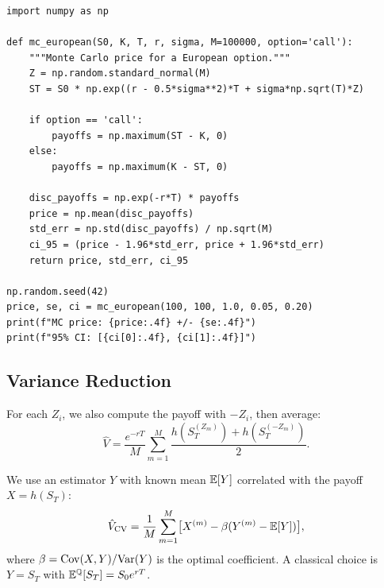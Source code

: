 \begin{codeblock}[title=\textbf{Monte Carlo for a European Call}]
\begin{verbatim}
import numpy as np

def mc_european(S0, K, T, r, sigma, M=100000, option='call'):
    """Monte Carlo price for a European option."""
    Z = np.random.standard_normal(M)
    ST = S0 * np.exp((r - 0.5*sigma**2)*T + sigma*np.sqrt(T)*Z)

    if option == 'call':
        payoffs = np.maximum(ST - K, 0)
    else:
        payoffs = np.maximum(K - ST, 0)

    disc_payoffs = np.exp(-r*T) * payoffs
    price = np.mean(disc_payoffs)
    std_err = np.std(disc_payoffs) / np.sqrt(M)
    ci_95 = (price - 1.96*std_err, price + 1.96*std_err)
    return price, std_err, ci_95

np.random.seed(42)
price, se, ci = mc_european(100, 100, 1.0, 0.05, 0.20)
print(f"MC price: {price:.4f} +/- {se:.4f}")
print(f"95% CI: [{ci[0]:.4f}, {ci[1]:.4f}]")
\end{verbatim}
\end{codeblock}

\subsection{Variance Reduction}

\begin{definition}
For each $Z_i$, we also compute the payoff with $-Z_i$, then average:
\[
    \hat{V} = \frac{e^{-rT}}{M}\sum_{m=1}^{M}
    \frac{h(S_T^{(Z_m)}) + h(S_T^{(-Z_m)})}{2}.
\]
\end{definition}

\begin{definition}
We use an estimator $Y$ with known mean $\mathbb{E}[Y]$ correlated with the
payoff $X = h(S_T)$:
\[
    \hat{V}_{\text{CV}} = \frac{1}{M}\sum_{m=1}^{M}
    \bigl[X^{(m)} - \beta(Y^{(m)} - \mathbb{E}[Y])\bigr],
\]
where $\beta = \mathrm{Cov}(X,Y)/\mathrm{Var}(Y)$ is the optimal coefficient.
A classical choice is $Y = S_T$ with $\mathbb{E}^\mathbb{Q}[S_T] = S_0 e^{rT}$.
\end{definition}

